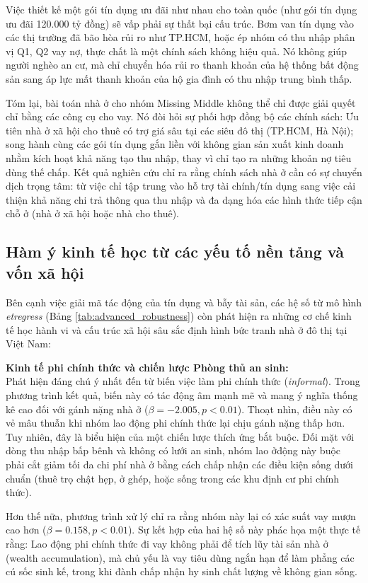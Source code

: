 \documentclass[12pt,a4paper]{report}
\begin{document}
Việc thiết kế một gói tín dụng ưu đãi như nhau cho toàn quốc (như gói tín dụng ưu đãi 120.000 tỷ đồng) sẽ vấp phải sự thất bại cấu trúc. Bơm van tín dụng vào các thị trường đã bão hòa rủi ro như TP.HCM, hoặc ép nhóm có thu nhập phân vị Q1, Q2 vay nợ, thực chất là một chính sách không hiệu quả. Nó không giúp người nghèo an cư, mà chỉ chuyển hóa rủi ro thanh khoản của hệ thống bất động sản sang áp lực mất thanh khoản của hộ gia đình có thu nhập trung bình thấp. 

Tóm lại, bài toán nhà ở cho nhóm Missing Middle không thể chỉ được giải quyết chỉ bằng các công cụ cho vay. Nó đòi hỏi sự phối hợp đồng bộ các chính sách: Ưu tiên nhà ở xã hội cho thuê có trợ giá sâu tại các siêu đô thị (TP.HCM, Hà Nội); song hành cùng các gói tín dụng gắn liền với không gian sản xuất kinh doanh nhằm kích hoạt khả năng tạo thu nhập, thay vì chỉ tạo ra những khoản nợ tiêu dùng thế chấp. Kết quả nghiên cứu chỉ ra rằng chính sách nhà ở cần có sự chuyển dịch trọng tâm: từ việc chỉ tập trung vào hỗ trợ tài chính/tín dụng sang việc cải thiện khả năng chi trả thông qua thu nhập và đa dạng hóa các hình thức tiếp cận chỗ ở (nhà ở xã hội hoặc nhà cho thuê).

\subsection{Hàm ý kinh tế học từ các yếu tố nền tảng và vốn xã hội}

Bên cạnh việc giải mã tác động của tín dụng và bẫy tài sản, các hệ số từ mô hình \textit{etregress} (Bảng \ref{tab:advanced_robustness}) còn phát hiện ra những cơ chế kinh tế học hành vi và cấu trúc xã hội sâu sắc định hình bức tranh nhà ở đô thị tại Việt Nam:

\textbf{Kinh tế phi chính thức và chiến lược Phòng thủ an sinh:} \\
Phát hiện đáng chú ý nhất đến từ biến việc làm phi chính thức (\textit{informal}). Trong phương trình kết quả, biến này có tác động âm mạnh mẽ và mang ý nghĩa thống kê cao đối với gánh nặng nhà ở ($\beta = -2.005, p < 0.01$). Thoạt nhìn, điều này có vẻ mâu thuẫn khi nhóm lao động phi chính thức lại chịu gánh nặng thấp hơn. Tuy nhiên, đây là biểu hiện của một chiến lược thích ứng bắt buộc. Đối mặt với dòng thu nhập bấp bênh và không có lưới an sinh, nhóm lao ởđộng này buộc phải cắt giảm tối đa chi phí nhà ở bằng cách chấp nhận các điều kiện sống dưới chuẩn (thuê trọ chật hẹp, ở ghép, hoặc sống trong các khu định cư phi chính thức). 

Hơn thế nữa, phương trình xử lý chỉ ra rằng nhóm này lại có xác suất vay mượn cao hơn ($\beta = 0.158, p < 0.01$). Sự kết hợp của hai hệ số này phác họa một thực tế rằng: Lao động phi chính thức đi vay không phải để tích lũy tài sản nhà ở (wealth accumulation), mà chủ yếu là vay tiêu dùng ngắn hạn để làm phẳng các cú sốc sinh kế, trong khi đành chấp nhận hy sinh chất lượng về không gian sống.
\end{document}
